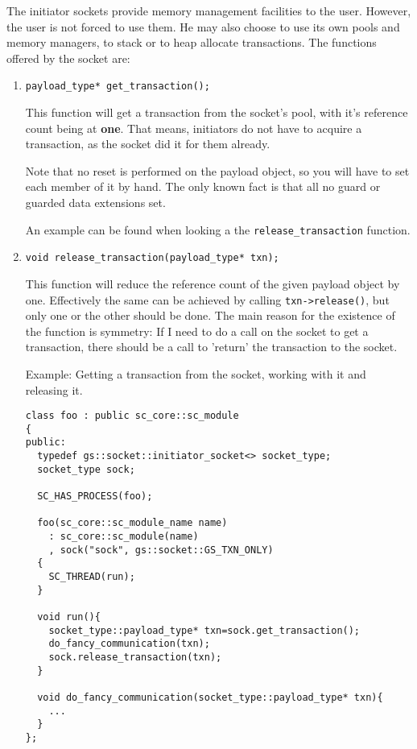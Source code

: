 \documentclass[a4paper,10pt]{article}          %
\begin{document}
The initiator sockets provide memory management facilities to the user. However, the user is not forced to use them. He may also choose to use its own pools and memory managers, to stack or to heap allocate transactions. 
The functions offered by the socket are:

\begin{enumerate}
\item 
\verb|payload_type* get_transaction();|

This function will get a transaction from the socket's pool, with it's reference count being at \textbf{one}. That means, initiators do not have to acquire a transaction, as the socket did it for them already.

Note that no reset is performed on the payload object, so you will have to set each member of it by hand. The only known fact is that all no guard or guarded data extensions set.

An example can be found when looking a the \verb|release_transaction| function.

\item 
\verb|void release_transaction(payload_type* txn);|

This function will reduce the reference count of the given payload object by one. Effectively the same can be achieved by calling \verb|txn->release()|, but only one or the other should be done. The main reason for the existence of the function is symmetry: If I need to do a call on the socket to get a transaction, there should be a call to 'return' the transaction to the socket.

Example: Getting a transaction from the socket, working with it and releasing it.

\begin{small}
\begin{verbatim}
class foo : public sc_core::sc_module
{
public:
  typedef gs::socket::initiator_socket<> socket_type;
  socket_type sock;
  
  SC_HAS_PROCESS(foo);

  foo(sc_core::sc_module_name name)
    : sc_core::sc_module(name)
    , sock("sock", gs::socket::GS_TXN_ONLY)
  {
    SC_THREAD(run);
  }
  
  void run(){
    socket_type::payload_type* txn=sock.get_transaction();
    do_fancy_communication(txn);
    sock.release_transaction(txn);
  }
  
  void do_fancy_communication(socket_type::payload_type* txn){
    ...
  }
};
\end{verbatim}
\end{small}


\end{enumerate}
\end{document}
